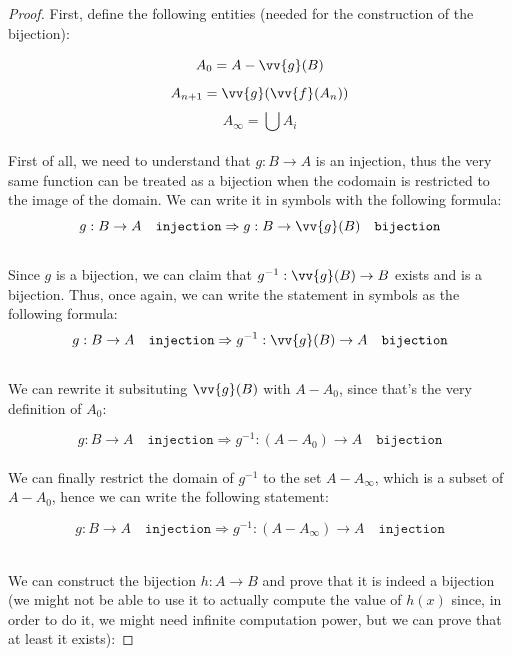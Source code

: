 \begin{proof}
    First, define the following entities (needed for the construction of the bijection):

    $$ A_0 = A - \vv{g}(B)            $$ 
    $$ A_{n+1} = \vv{g}(\vv{f}(A_n))  $$ 
    $$ A_{\infty} = \bigcup A_i       $$ \\

    
    First of all, we need to understand that $g : B \rightarrow A$ is an injection, 
    thus the very same function can be treated as a bijection when the codomain is
    restricted to the image of the domain. We can write it in symbols with the 
    following formula: \\

    $$ g : B \rightarrow A \quad\texttt{injection} 
    \Rightarrow g : B \rightarrow \vv{g}(B) \quad\texttt{bijection} $$ \\

    Since $g$ is a bijection, we can claim that $g^{-1} : \vv{g}(B) \rightarrow B $ 
    exists and is a bijection. Thus, once again, we can write the statement in 
    symbols as the following formula: \\

    $$ g : B \rightarrow A \quad\texttt{injection} 
    \Rightarrow g^{-1} : \vv{g}(B) \rightarrow A \quad\texttt{bijection} $$ \\

    We can rewrite it subsituting $\vv{g}(B)$ with $A - A_0$, since that's the very
    definition of $A_0$:

    $$ g : B \rightarrow A \quad\texttt{injection} 
    \Rightarrow g^{-1} : (A - A_0) \rightarrow A \quad\texttt{bijection} $$ \\

    We can finally restrict the domain of $g^{-1}$ to the set $A - A_{\infty}$, which 
    is a subset of $A - A_0$, hence we can write the following statement:

    $$ g : B \rightarrow A \quad\texttt{injection} 
    \Rightarrow g^{-1} : (A - A_{\infty}) \rightarrow A \quad\texttt{injection} $$ \\

    \newpage

    We can construct the bijection $h : A \rightarrow B$ and prove that it is 
    indeed a bijection (we might not be able to use it to actually compute the 
    value of $h(x)$ since, in order to do it, we might need infinite computation
    power, but we can prove that at least it exists):


\end{proof}
